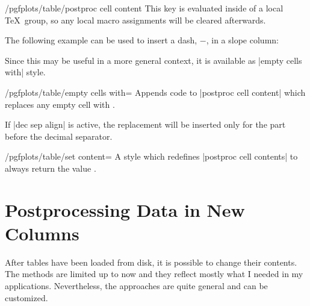 \begin{codekey}{/pgfplots/table/postproc cell content}
	This key is evaluated inside of a local \TeX\ group, so any local macro assignments will be cleared afterwards.

	The following example can be used to insert a dash, $-$, in a slope column:
\begin{codeexample}[]

\end{codeexample}
Since this may be useful in a more general context, it is available as |empty cells with| style.
\end{codekey}

\begin{stylekey}{/pgfplots/table/empty cells with=}
	Appends code to |postproc cell content| which replaces any empty cell with .

	If |dec sep align| is active, the replacement will be inserted only for the part before the decimal separator.
\end{stylekey}

\begin{stylekey}{/pgfplots/table/set content=}
	A style which redefines |postproc cell contents| to always return the value .
\end{stylekey}


\section{Postprocessing Data in New Columns}
\label{pgfplotstable:createcol}
After tables have been loaded from disk, it is possible to change their contents. The methods are limited up to now and they reflect mostly what I needed in my applications. Nevertheless, the approaches are quite general and can be customized.

